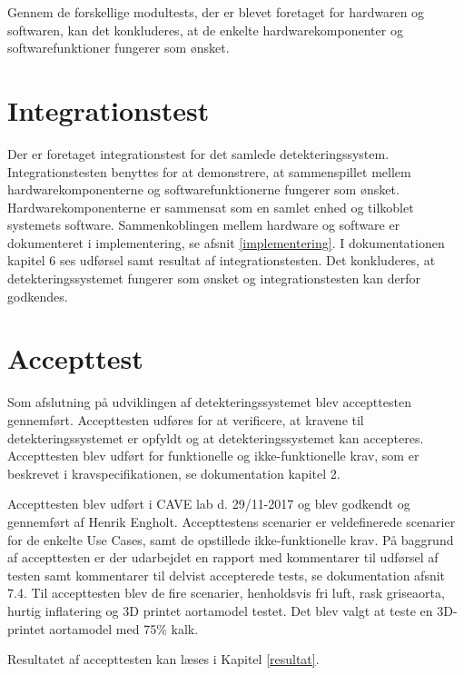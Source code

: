 Gennem de forskellige modultests, der er blevet foretaget for hardwaren og softwaren, kan det konkluderes, at de enkelte hardwarekomponenter og softwarefunktioner fungerer som ønsket. 


\section{Integrationstest}
Der er foretaget integrationstest for det samlede detekteringssystem. Integrationstesten benyttes for at demonstrere, at sammenspillet mellem hardwarekomponenterne og softwarefunktionerne fungerer som ønsket. Hardwarekomponenterne er sammensat som en samlet enhed og tilkoblet systemets software. Sammenkoblingen mellem hardware og software er dokumenteret i implementering, se afsnit \ref{implementering}. I dokumentationen kapitel 6 ses udførsel samt resultat af integrationstesten. Det konkluderes, at detekteringssystemet fungerer som ønsket og integrationstesten kan derfor godkendes. 

\section{Accepttest}\label{accepttest}
Som afslutning på udviklingen af detekteringssystemet blev accepttesten gennemført. Accepttesten udføres for at verificere, at kravene til detekteringssystemet er opfyldt og at detekteringssystemet kan accepteres. Accepttesten blev udført for funktionelle og ikke-funktionelle krav, som er beskrevet i kravspecifikationen, se dokumentation kapitel 2. 

Accepttesten blev udført i CAVE lab d. 29/11-2017 og blev godkendt og gennemført af Henrik Engholt. Accepttestens scenarier er veldefinerede scenarier for de enkelte Use Cases, samt de opstillede ikke-funktionelle krav. På baggrund af accepttesten er der udarbejdet en rapport med kommentarer til udførsel af testen samt kommentarer til delvist accepterede tests, se dokumentation afsnit 7.4. Til accepttesten blev de fire scenarier, henholdsvis fri luft, rask griseaorta, hurtig inflatering og 3D printet aortamodel testet. Det blev valgt at teste en 3D-printet aortamodel med 75\% kalk. 

Resultatet af accepttesten kan læses i Kapitel \ref{resultat}. 




 



























